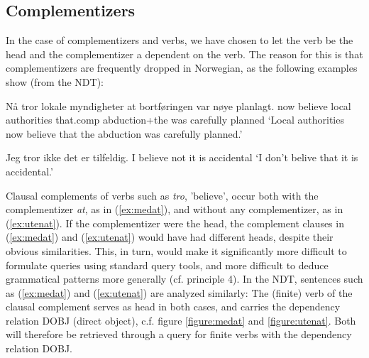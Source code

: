\documentclass[10pt,a4paper]{article}
\begin{document}
\subsection{Complementizers}
In the case of complementizers and verbs, we have chosen to let the verb be the head and the complementizer a dependent on the verb. The reason for this is that
complementizers are frequently dropped in Norwegian, as the following examples show (from the NDT):

\begin{examples}
\item\label{ex:medat}
\gll Nå tror lokale myndigheter at bortføringen var nøye planlagt.
now believe local authorities that.comp abduction+the was carefully planned
\glt `Local authorities now believe that the abduction was carefully planned.'
\glend

\item\label{ex:utenat}
\gll Jeg tror ikke det er tilfeldig.
I believe not it is accidental
\glt `I don't belive that it is accidental.'
\glend
\end{examples}

Clausal complements of verbs such as \emph{tro}, 'believe', occur both with the complementizer \emph{at}, as in (\ref{ex:medat}), and without any complementizer, as in (\ref{ex:utenat}). If the complementizer were the head, the complement clauses in (\ref{ex:medat}) and (\ref{ex:utenat}) would have had different heads, despite their obvious similarities. This, in turn, would make it significantly more difficult to formulate queries using standard query tools, and more difficult to deduce grammatical patterns more generally (cf. principle 4).
In the NDT,
sentences such as (\ref{ex:medat}) and (\ref{ex:utenat}) are analyzed similarly: The (finite) verb of the clausal complement serves as head in both cases, and carries the dependency relation DOBJ (direct object), c.f. figure \ref{figure:medat} and \ref{figure:utenat}.
Both will therefore be retrieved through a query for finite verbs with the dependency relation DOBJ.
\end{document}
